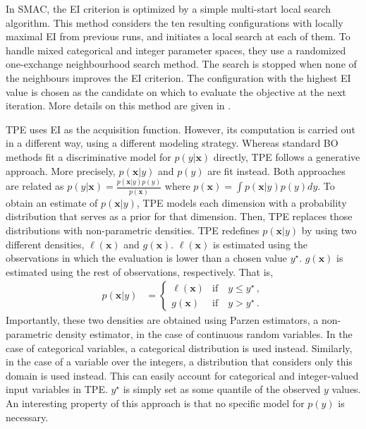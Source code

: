 In SMAC, the EI criterion is optimized by a simple multi-start local search algorithm. This method considers 
the ten resulting configurations with locally maximal EI from previous runs, and initiates a local search at each 
of them. To handle mixed categorical and integer parameter spaces, they use a randomized one-exchange 
neighbourhood search method. The search is stopped when none of the neighbours improves the EI criterion.
The configuration with the highest EI value is chosen as the candidate on which to evaluate the objective at 
the next iteration. More details on this method are given in \citep{hutter2011sequential}. 

TPE uses EI as the acquisition function. However, its computation is carried out in a 
different way, using a different modeling strategy. Whereas standard BO methods fit a 
discriminative model for $p(y|\mathbf{x})$ directly, TPE follows a generative approach. More 
precisely, $p(\mathbf{x}|y)$ and $p(y)$ are fit instead. Both approaches are related as 
$p(y|\mathbf{x}) = \frac{p(\mathbf{x}|y)p(y)}{p(\mathbf{x})}$ where $p(\mathbf{x}) = \int p(\mathbf{x}|y)p(y)dy$. 
To obtain an estimate of  $p(\mathbf{x}|y)$, TPE models each dimension with a probability distribution that serves 
as a prior for that dimension. Then, TPE replaces those distributions with non-parametric densities. 
TPE redefines $p(\mathbf{x}|y)$ by using two different densities, $\ell(\mathbf{x})$ and $g(\mathbf{x})$.
$\ell(\mathbf{x})$ is estimated using the observations in which the evaluation is lower than a 
chosen value $y^\star$. $g(\mathbf{x})$ is estimated using the rest of observations, respectively. That is,
\begin{align}
p(\mathbf{x}|y) & = \left\{ \begin{array}{cc}
	\ell(\mathbf{x}) & \text{if} \quad y \leq y^\star \,, \\
	g(\mathbf{x}) & \text{if} \quad y > y^\star \,.  
\end{array} \right.
\end{align}
Importantly, these two densities are obtained using Parzen estimators, a non-parametric density estimator, 
in the case of continuous random variables. In the case of  categorical
variables, a categorical distribution is used instead. Similarly, in the case of a variable over the integers,
a distribution that considers only this domain is used instead. This can easily account for categorical and integer-valued 
input variables in TPE. $y^\star$ is simply set as some quantile of the observed $y$ values. 
An interesting property of this approach is that no specific model for $p(y)$ is necessary. 
